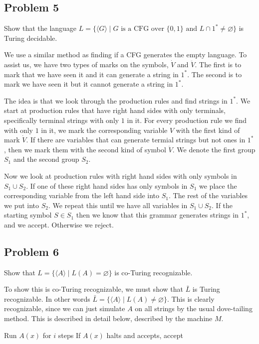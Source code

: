 \documentclass[english]{article}
\begin{document}
\subsection*{Problem 5}
Show that the language 
$L = \{ \langle G \rangle \mid
	\textrm{$G$ is a CFG over $\{0,1\}$ and $L \cap 1^* \neq \varnothing$}\}$
is Turing decidable.

We use a similar method as finding if a CFG generates the empty language.
To assist us, we have two types of marks on the symbols, $\dot{V}$ and
$\ddot{V}$. The first is to mark that we have seen it and it can generate
a string in $1^*$. The second is to mark we have seen it but it cannot
generate a string in $1^*$.  

The idea is that we look through the production rules and find strings in
$1^*$. We start at production rules that have right hand sides with only 
terminals, specifically terminal strings with only $1$ in it. For every
production rule we find with only $1$ in it, we mark the corresponding
variable $V$ with the first kind of mark $\dot{V}$. If there are 
variables that can generate termial strings but not ones in $1^*$,
then we mark them with the second kind of symbol $\ddot{V}$. We denote
the first group $S_1$ and the second group $S_2$. 

Now we look at production rules with right hand sides with only symbols
in $S_1 \cup S_2$. If one of these right hand sides has only symbols
in $S_1$ we place the corresponding variable from the left hand side
into $S_1$. The rest of the variables we put into $S_2$. We repeat this
until we have all variables in $S_1 \cup S_2$. If the starting symbol
$S \in S_1$ then we know that this grammar generates strings in $1^*$,
and we accept. Otherwise we reject.

\subsection*{Problem 6}
Show that $L = \{ \langle A \rangle \mid L(A) = \varnothing \}$ is 
co-Turing recognizable.

To show this is co-Turing recognizable, we must show that $\bar{L}$ is Turing
recognizable. In other words $\bar{L} = \{ \langle A \rangle \mid
L(A) \neq \varnothing \}$. This is clearly recognizable, since we can just
simulate $A$ on all strings by the usual dove-tailing method. This is described
in detail below, described by the machine $M$.

\begin{algorithmic}
			\State Run $A(x)$ for $i$ steps
			\State If $A(x)$ halts and accepts, accept
		\EndFor 
	\EndFor
\EndFunction
\end{algorithmic}
\end{document}
